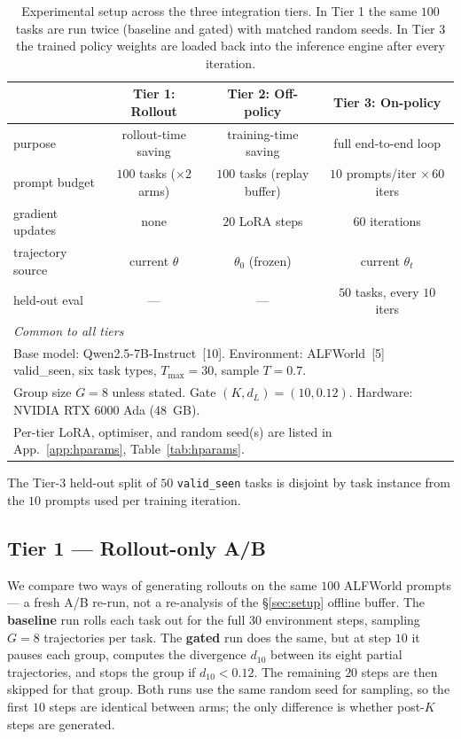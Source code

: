 \documentclass{article}
\begin{document}
\begin{table}[t]
\centering
\caption{Experimental setup across the three integration tiers.
In Tier 1 the same $100$ tasks are run twice (baseline and gated)
with matched random seeds. In Tier 3 the trained policy weights
are loaded back into the inference engine after every iteration.}
\label{tab:setup}
\footnotesize
\setlength{\tabcolsep}{4pt}
\begin{tabular}{lccc}
\toprule
& \textbf{Tier 1: Rollout} & \textbf{Tier 2: Off-policy} & \textbf{Tier 3: On-policy} \\
\midrule
purpose            & rollout-time saving & training-time saving & full end-to-end loop \\
prompt budget      & $100$ tasks ($\times 2$ arms) & $100$ tasks (replay buffer) & $10$ prompts/iter $\times\,60$ iters \\
gradient updates   & none & $20$ LoRA steps & $60$ iterations \\
trajectory source  & current $\theta$ & $\theta_0$ (frozen) & current $\theta_t$ \\
held-out eval      & --- & --- & $50$ tasks, every $10$ iters \\
\midrule
\multicolumn{4}{l}{\emph{Common to all tiers}} \\
\multicolumn{4}{l}{\quad Base model: Qwen2.5-7B-Instruct~[10].
Environment: ALFWorld~[5] valid\_seen, six task types,
$T_{\max}\!=\!30$, sample $T\!=\!0.7$.} \\
\multicolumn{4}{l}{\quad Group size $G\!=\!8$ unless stated.
Gate $(K, d_L)\!=\!(10, 0.12)$.
Hardware: NVIDIA RTX 6000 Ada (48~GB).} \\
\multicolumn{4}{l}{\quad Per-tier LoRA, optimiser, and random
seed(s) are listed in App.~\ref{app:hparams},
Table~\ref{tab:hparams}.} \\
\bottomrule
\end{tabular}
\end{table}

The Tier-3 held-out split of $50$ \texttt{valid\_seen} tasks is
disjoint by task instance from the $10$ prompts used per training
iteration.

\subsection{Tier 1 — Rollout-only A/B}
\label{sec:wallclock}

We compare two ways of generating rollouts on the same $100$
ALFWorld prompts --- a fresh A/B re-run, not a re-analysis of the
\S\ref{sec:setup} offline buffer. The \textbf{baseline} run rolls
each task out for the full $30$ environment steps, sampling
$G = 8$ trajectories per task. The \textbf{gated} run does the
same, but at step $10$ it pauses each group, computes the
divergence $d_{10}$ between its eight partial trajectories, and
stops the group if $d_{10} < 0.12$. The remaining $20$ steps are
then skipped for that group. Both runs use the same random seed
for sampling, so the first $10$ steps are identical between
arms; the only difference is whether post-$K$ steps are
generated.
\end{document}
